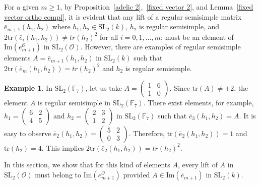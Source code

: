 \documentclass[10pt,twoside]{amsart}
\newcommand{\SL}{\mathrm{SL}}
\newcommand{\tr}{\mathrm{tr}}
\newcommand{\im}{\mathrm{Im}}
\theoremstyle{definition}
\theoremstyle{definition}
\newtheorem{example}[theorem]{Example}
\begin{document}
For a given $m\geq 1$, by Proposition~\ref{adelic 2},~\ref{fixed vector 2}, and Lemma~\ref{fixed vector ortho compl}, it is evident that any lift of a regular semisimple matrix $\bar e_{m+1}(h_1,h_2)$ where $h_1, h_2\in \SL_2(k)$, $h_2$ is regular semisimple, and $2\tr(\bar e_{i}(h_1, h_2)) \neq tr(h_2)^2$ for all $i=0, 1, \ldots, m$; must be an element of $\im(e_{m+1}^{\mathcal{O}})$ in $\SL_2(\mathcal{O})$. However, there are examples of regular semisimple elements $A = \bar e_{m+1}(h_1, h_2)$ in $\SL_2(k)$ such that $2\tr(\bar e_{m}(h_1, h_2)) = tr(h_2)^2$ and $h_2$ is regular semisimple.
\begin{example}
In $\SL_2(\mathbb{F}_7)$, let us take $A= \left(\begin{array}{cc} 1 & 6 \\ 1 & 0 \end{array}\right)$. Since $\tr(A)\neq \pm 2$, the element $A$ is regular semisimple in $\SL_2(\mathbb{F}_7)$. There exist elements, for example, $h_1= \left(\begin{array}{cc} 6 & 2 \\ 4 & 5 \end{array} \right)$ and $h_2 = \left(\begin{array}{cc} 2 & 3 \\ 1 & 2    \end{array}\right)$ in $\SL_2(\mathbb{F}_7)$ such that $\bar e_3(h_1, h_2) = A$. It is easy to observe $\bar e_2(h_1, h_2) = \left(\begin{array}{cc} 5 & 2 \\ 0 & 3 \end{array}\right)$. Therefore, $\tr(\bar e_2(h_1, h_2)) = 1$ and $\tr(h_2) = 4$. This implies $2\tr(\bar e_{2}(h_1,h_2)) = tr(h_2)^2$.
\end{example}
\noindent In this section, we show that for this kind of elements $A$, every lift of $A$ in $\SL_2(\mathcal{O})$ must belong to $\im(e_{m+1}^{\mathcal{O}})$ provided $A\in \im(\bar e_{m+1})$ in $\SL_2(k)$.
\end{document}
